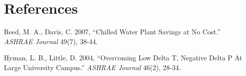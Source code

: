 \chapter{References}\label{references}

Reed, M. A., Davis, C. 2007, ``Chilled Water Plant Savings at No Cost.'' \emph{ASHRAE Journal} 49(7), 38-44.

Hyman, L. B., Little, D. 2004, ``Overcoming Low Delta T, Negative Delta P At Large University Campus.'' \emph{ASHRAE Journal} 46(2), 28-34.

